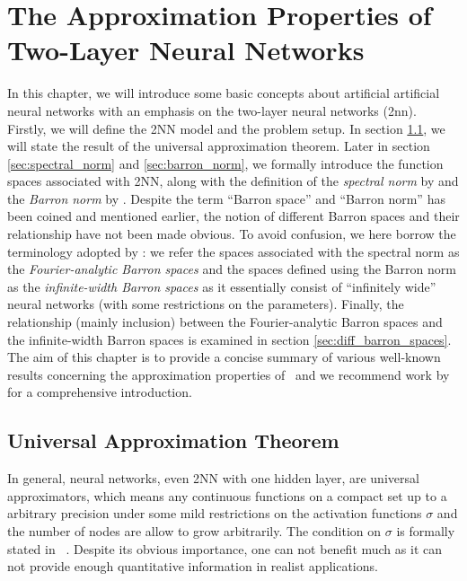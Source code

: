 \chapter{The Approximation Properties of Two-Layer Neural Networks}

In this chapter, we will introduce some basic concepts about artificial
artificial neural networks with an emphasis on the two-layer neural networks
(\gls{2nn}). Firstly, we will define the 2NN model and the problem setup. In
section \ref{sec:uat}, we will state the result of the universal approximation
theorem. Later in section \ref{sec:spectral_norm} and \ref{sec:barron_norm}, we
formally introduce the function spaces associated with 2NN, along with the
definition of the \textit{spectral norm} by
\cite{barronUniversalApproximationBounds1993} and the \textit{Barron norm} by
\cite{eBarronSpaceFlowinduced2021}. Despite the term ``Barron space'' and
``Barron norm'' has been coined and mentioned earlier, the notion of different
Barron spaces and their relationship have not been made obvious. To avoid
confusion, we here borrow the terminology adopted by
\cite{carageaNeuralNetworkApproximation2022}: we refer the spaces associated
with the spectral norm as the \textit{Fourier-analytic Barron spaces} and the
spaces defined using the Barron norm as the \textit{infinite-width Barron
spaces} as it essentially consist of ``infinitely wide'' neural networks (with
some restrictions on the parameters). Finally, the relationship (mainly
inclusion) between the Fourier-analytic Barron spaces and the infinite-width
Barron spaces is examined in section \ref{sec:diff_barron_spaces}. The aim of
this chapter is to provide a concise summary of various well-known results
concerning the approximation properties of \ and we recommend work by
\cite{eMathematicalUnderstandingNeural2020,bernerModernMathematicsDeep2021} for
a comprehensive introduction.






\section{Universal Approximation Theorem}
\label{sec:uat}

In general, neural networks, even 2NN with one hidden layer, are universal
approximators, which means any continuous functions on a compact set up to a
arbitrary precision under some mild restrictions on the activation functions
$\sigma$ and the number of nodes are allow to grow arbitrarily. The condition on
$\sigma$ is formally stated in
~\cite{cybenkoApproximationSuperpositionsSigmoidal1989}. Despite its obvious
importance, one can not benefit much as it can not provide enough quantitative
information in realist applications.

